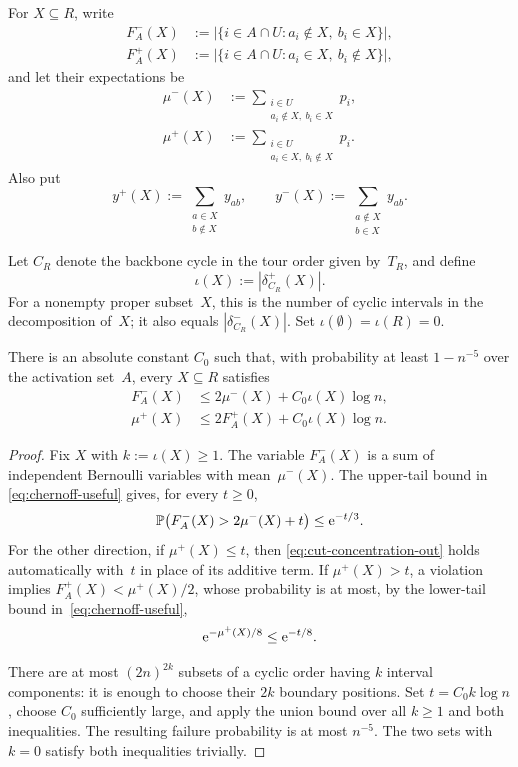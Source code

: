 \documentclass[12pt,a4paper,oneside]{report}
\begin{document}
For $X\subseteq R$, write
\begin{align*}
    F_A^-(X)
    &:=
    \bigl|\{i\in A\cap U:a_i\notin X,\ b_i\in X\}\bigr|,\\
    F_A^+(X)
    &:=
    \bigl|\{i\in A\cap U:a_i\in X,\ b_i\notin X\}\bigr|,
\end{align*}
and let their expectations be
\begin{align*}
    \mu^-(X)
    &:=
    \sum_{\substack{i\in U\\a_i\notin X,\ b_i\in X}}p_i,\\
    \mu^+(X)
    &:=
    \sum_{\substack{i\in U\\a_i\in X,\ b_i\notin X}}p_i.
\end{align*}
Also put
\[
    y^+(X):=\sum_{\substack{a\in X\\b\notin X}}y_{ab},
    \qquad
    y^-(X):=\sum_{\substack{a\notin X\\b\in X}}y_{ab}.
\]

Let $C_R$ denote the backbone cycle in the tour order given by~$T_R$, and define
\[
    \iota(X):=|\delta_{C_R}^+(X)|.
\]
For a nonempty proper subset~$X$, this is the number of cyclic intervals in
the decomposition of~$X$; it also equals
$|\delta_{C_R}^-(X)|$.  Set $\iota(\emptyset)=\iota(R)=0$.

\begin{lemma}\label{lem:offline-cut-concentration}
There is an absolute constant $C_0$ such that, with probability at least
$1-n^{-5}$ over the activation set~$A$, every $X\subseteq R$ satisfies
\begin{align}
    F_A^-(X)
    &\le2\mu^-(X)+C_0\iota(X)\log n,
    \label{eq:cut-concentration-in}\\
    \mu^+(X)
    &\le2F_A^+(X)+C_0\iota(X)\log n.
    \label{eq:cut-concentration-out}
\end{align}
\end{lemma}

\begin{proof}
Fix $X$ with $k:=\iota(X)\ge1$.  The variable $F_A^-(X)$ is a sum of independent
Bernoulli variables with mean~$\mu^-(X)$.  The upper-tail bound in
\cref{eq:chernoff-useful} gives, for every $t\ge0$,
\[
    \mathbb{P}\bigl(F_A^-(X)>2\mu^-(X)+t\bigr)\le\mathrm{e}^{-t/3}.
\]
For the other direction, if $\mu^+(X)\le t$, then
\cref{eq:cut-concentration-out} holds automatically with~$t$ in place of
its additive term.  If $\mu^+(X)>t$, a violation implies
$F_A^+(X)<\mu^+(X)/2$, whose probability is at most, by the lower-tail bound
in~\cref{eq:chernoff-useful},
\[
    \mathrm{e}^{-\mu^+(X)/8}\le\mathrm{e}^{-t/8}.
\]

There are at most $(2n)^{2k}$ subsets of a cyclic order having
$k$ interval components: it is enough to choose their $2k$ boundary
positions.  Set $t=C_0k\log n$, choose $C_0$ sufficiently large, and apply
the union bound over all $k\ge1$ and both inequalities.
The resulting failure
probability is at most $n^{-5}$.  The two sets with $k=0$ satisfy both
inequalities trivially.
\end{proof}
\end{document}
